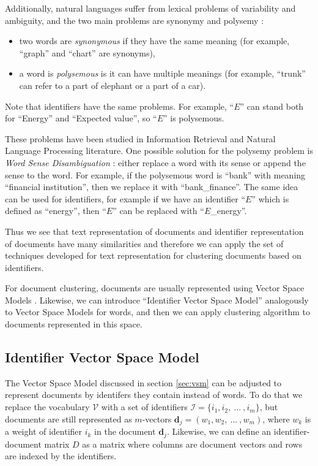 Additionally, natural languages suffer from lexical problems of variability
and ambiguity, and the two main problems are synonymy and polysemy
\cite{deerwester1990indexing} \cite{gliozzo2009semantic}:

\begin{itemize}
\itemsep1pt\parskip0pt
  \item two words are \emph{synonymous} if they have the same meaning
        (for example, ``graph'' and ``chart'' are synonyms),
  \item a word is \emph{polysemous} is it can have multiple meanings
        (for example, ``trunk'' can refer to a part of elephant or a part of a car).
\end{itemize}

Note that identifiers have the same problems. For example,
``$E$'' can stand both for ``Energy'' and ``Expected value'',
so ``$E$'' is polysemous.

These problems have been studied in Information Retrieval and
Natural Language Processing literature.
One possible solution for the polysemy problem is \emph{Word Sense Disambiguation}
\cite{jurafsky2000speech}: either replace a word with its sense
\cite{stokoe2003word} or append the sense to the word. For example,
if the polysemous word is ``bank'' with meaning ``financial institution'',
then we replace it with ``bank\_finance''. The same idea can be used
for identifiers, for example if we have an identifier ``$E$'' which is
defined as ``energy'', then ``$E$'' can be replaced with ``$E$\_energy''.

Thus we see that text representation of documents and identifier representation
of documents have many similarities and therefore we can apply the set of
techniques developed for text representation for clustering documents based
on identifiers.

For document clustering, documents are usually represented using
Vector Space Models \cite{oikonomakou2005review} \cite{aggarwal2012survey}.
Likewise, we can introduce ``Identifier Vector Space Model'' analogously to
Vector Space Models for words, and then we can apply clustering algorithm
to documents represented in this space.


\subsection{Identifier Vector Space Model} \label{sec:ism}

The Vector Space Model discussed in section \ref{sec:vsm} can be adjusted to 
represent documents by identifers they contain instead of words. 
To do that we replace the vocabulary $\mathcal V$
with  a set of identifiers $\mathcal I = \{ i_1, i_2, \ ... \ , i_m \}$,
but documents are still represented as $m$-vectors $\mathbf d_j = (w_1, w_2, \ ... \ , w_m)$,
where $w_k$ is a weight of identifier $i_k$ in the document $\mathbf d_j$.
Likewise, we can define an identifier-document matrix $D$ as a matrix where
columns are document vectors and rows are indexed by the identifiers.

